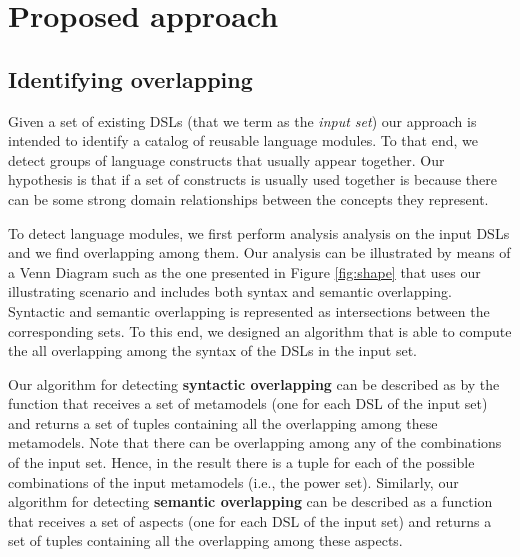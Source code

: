 \section{Proposed approach}
\label{sec:apprach}

\subsection{Identifying overlapping}
\label{sec:metrics}

Given a set of existing DSLs (that we term as the \textit{input set}) our approach is intended to identify a catalog of reusable language modules. To that end, we detect groups of language constructs that usually appear together. Our hypothesis is that if a set of constructs is usually used together is because there can be some strong domain relationships between the concepts they represent. 

To detect language modules, we first perform analysis analysis on the input DSLs and we find overlapping among them. Our analysis can be illustrated by means of a Venn Diagram such as the one presented in Figure \ref{fig:shape} that uses our illustrating scenario and includes both syntax and semantic overlapping. Syntactic and semantic overlapping is represented as intersections between the corresponding sets. To this end, we designed an algorithm that is able to compute the all overlapping among the syntax of the DSLs in the input set. 

Our algorithm for detecting \textbf{syntactic overlapping} can be described as by the function that receives a set of metamodels (one for each DSL of the input set) and returns a set of tuples containing all the overlapping among these metamodels. Note that there can be overlapping among any of the combinations of the input set. Hence, in the result there is a tuple for each of the possible combinations of the input metamodels (i.e., the power set). Similarly, our algorithm for detecting \textbf{semantic overlapping} can be described as a function that receives a set of aspects (one for each DSL of the input set) and returns a set of tuples containing all the overlapping among these aspects.

